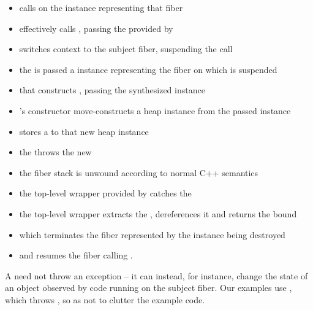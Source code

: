 \begin{itemize}
    \item {} calls  on the
          instance representing that fiber
    \item \cancel effectively calls \resumewith, passing
          the \cancelfn provided by 
    \item \resumewith switches context to the subject fiber, suspending the
          \cancel call
    \item the \cancelfn is passed a \fiber instance representing the fiber on
          which \cancel is suspended
    \item that \cancelfn constructs , passing the
          synthesized \fiber instance
    \item {}'s constructor move-constructs a heap \fiber
          instance from the passed \fiber instance
    \item {} stores a  to that new
          heap \fiber instance
    \item the \cancelfn throws the new 
    \item the fiber stack is unwound according to normal C++ semantics
    \item the top-level wrapper provided by  catches the
    \item the top-level wrapper extracts the , dereferences
          it and returns the bound \fiber
    \item which terminates the fiber represented by the 
          instance being destroyed
    \item and resumes the fiber calling \cancel.
\end{itemize}

A \cancelfn need not throw an exception -- it can instead, for instance,
change the state of an object observed by code running on the subject fiber.
Our examples use , which throws , so as
not to clutter the example code.
